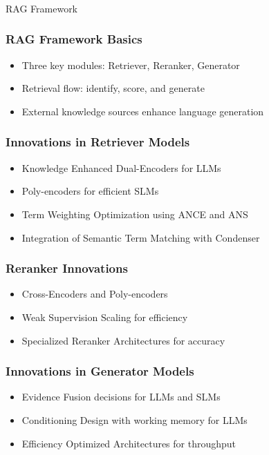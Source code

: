 \begin{frame}[fragile]\frametitle{}
\begin{center}
{\Large RAG Framework}
\end{center}
\end{frame}

\begin{frame}[fragile]\frametitle{RAG Framework Basics}
  \begin{itemize}
    \item Three key modules: Retriever, Reranker, Generator
    \item Retrieval flow: identify, score, and generate
    \item External knowledge sources enhance language generation
  \end{itemize}
\end{frame}

\begin{frame}[fragile]\frametitle{Innovations in Retriever Models}
  \begin{itemize}
    \item Knowledge Enhanced Dual-Encoders for LLMs
    \item Poly-encoders for efficient SLMs
    \item Term Weighting Optimization using ANCE and ANS
    \item Integration of Semantic Term Matching with Condenser
  \end{itemize}
\end{frame}

\begin{frame}[fragile]\frametitle{Reranker Innovations}
  \begin{itemize}
    \item Cross-Encoders and Poly-encoders
    \item Weak Supervision Scaling for efficiency
    \item Specialized Reranker Architectures for accuracy
  \end{itemize}
\end{frame}

\begin{frame}[fragile]\frametitle{Innovations in Generator Models}
  \begin{itemize}
    \item Evidence Fusion decisions for LLMs and SLMs
    \item Conditioning Design with working memory for LLMs
    \item Efficiency Optimized Architectures for throughput
  \end{itemize}
\end{frame}

